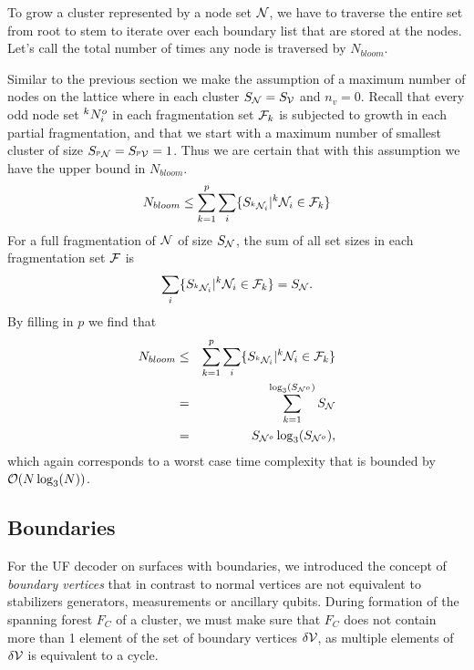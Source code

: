 To grow a cluster represented by a node set $\mathcal{N}$, we have to traverse the entire set from root to stem to iterate over each boundary list that are stored at the nodes. Let's call the total number of times any node is traversed by  $N_{bloom}$.

Similar to the previous section we make the assumption of a maximum number of nodes on the lattice where in each cluster $S_{\mathcal{N}} = S_{\mathcal{V}}$ and $n_v = 0$. Recall that every odd node set ${}^{k}N^o_i$ in each fragmentation set $\mathcal{F}_k$ is subjected to growth in each partial fragmentation, and that we start with a maximum number of smallest cluster of size $S_{{}^{p}\mathcal{N}} = S_{{}^{p}\mathcal{V}} = 1$. Thus we are certain that with this assumption we have the upper bound in $N_{bloom}$.
\begin{equation}\label{eq:nnode}
  N_{bloom} \leq \sum^{p}_{k=1}\sum_i \{ S_{{}^{k}\mathcal{N}_i} | {}^{k}\mathcal{N}_i \in \mathcal{F}_k \}
\end{equation}
For a full fragmentation of $\mathcal{N}$ of size $S_{\mathcal{N}}$, the sum of all set sizes in each fragmentation set $\mathcal{F}$ is
\begin{equation}\label{eq:sumsetsfrag}
  \sum_i \{S_{{}^{k}\mathcal{N}_i} | {}^{k}\mathcal{N}_i \in \mathcal{F}_k \} = S_{\mathcal{N}}.
\end{equation}
By filling in $p$ we find that
\begin{eqnarray}
  \nonumber N_{bloom} &\leq& \sum^{p}_{k=1}\sum_i \{ S_{{}^{k}\mathcal{N}_i} | {}^{k}\mathcal{N}_i \in \mathcal{F}_k \} \\
  \nonumber &=& \sum_{k=1}^{\log_3(S_{\mathcal{N}^o})} S_{\mathcal{N}} \\
   &=& S_{\mathcal{N}^o}\log_3(S_{\mathcal{N}^o}),
\end{eqnarray}
which again corresponds to a worst case time complexity that is bounded by $\mathcal{O}(N\log_3(N))$.

\subsection{Boundaries}
For the UF decoder on surfaces with boundaries, we introduced the concept of \emph{boundary vertices} that in contrast to normal vertices are not equivalent to stabilizers generators, measurements or ancillary qubits. During formation of the spanning forest $F_C$ of a cluster, we must make sure that $F_C$ does not contain more than 1 element of the set of boundary vertices $\delta\mathcal{V}$, as multiple elements of $\delta\mathcal{V}$ is equivalent to a cycle.

